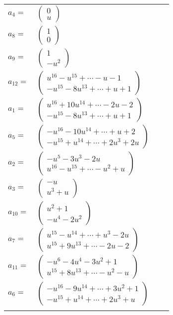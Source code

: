 \documentclass[1p]{elsarticle_modified}
\theoremstyle{definition}
\begin{document}
\begin{tabular}{m{7pt} m{180pt} m{7pt} m{180pt} }
\flushright $a_{4}=$&$\begin{pmatrix}0\\u\end{pmatrix}$ \\
\flushright $a_{8}=$&$\begin{pmatrix}1\\0\end{pmatrix}$ \\
\flushright $a_{9}=$&$\begin{pmatrix}1\\- u^2\end{pmatrix}$ \\
\flushright $a_{12}=$&$\begin{pmatrix}u^{16}- u^{15}+\cdots- u-1\\- u^{15}-8 u^{13}+\cdots+u+1\end{pmatrix}$ \\
\flushright $a_{1}=$&$\begin{pmatrix}u^{16}+10 u^{14}+\cdots-2 u-2\\- u^{15}-8 u^{13}+\cdots+u+1\end{pmatrix}$ \\
\flushright $a_{5}=$&$\begin{pmatrix}- u^{16}-10 u^{14}+\cdots+u+2\\- u^{15}+u^{14}+\cdots+2 u^3+2 u\end{pmatrix}$ \\
\flushright $a_{2}=$&$\begin{pmatrix}- u^5-3 u^3-2 u\\u^{16}- u^{15}+\cdots- u^2+u\end{pmatrix}$ \\
\flushright $a_{3}=$&$\begin{pmatrix}- u\\u^3+u\end{pmatrix}$ \\
\flushright $a_{10}=$&$\begin{pmatrix}u^2+1\\- u^4-2 u^2\end{pmatrix}$ \\
\flushright $a_{7}=$&$\begin{pmatrix}u^{15}- u^{14}+\cdots+u^3-2 u\\u^{15}+9 u^{13}+\cdots-2 u-2\end{pmatrix}$ \\
\flushright $a_{11}=$&$\begin{pmatrix}- u^6-4 u^4-3 u^2+1\\u^{15}+8 u^{13}+\cdots- u^2- u\end{pmatrix}$ \\
\flushright $a_{6}=$&$\begin{pmatrix}- u^{16}-9 u^{14}+\cdots+3 u^2+1\\- u^{15}+u^{14}+\cdots+2 u^3+u\end{pmatrix}$\\&\end{tabular}
\end{document}
